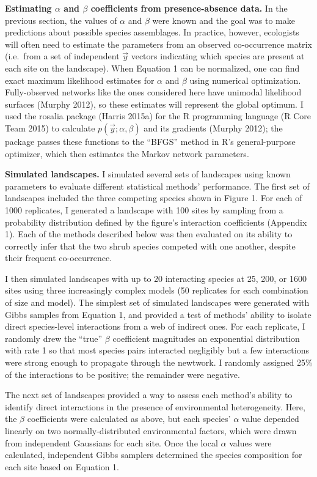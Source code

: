 \documentclass[12pt,]{article}
\begin{document}
\begin{spacing}{1.9}
\begin{flushleft}
\noindent \textbf{Estimating $\alpha$ and $\beta$ coefficients from presence-absence data.}
In the previous section, the values of \(\alpha\) and \(\beta\) were
known and the goal was to make predictions about possible species
assemblages. In practice, however, ecologists will often need to
estimate the parameters from an observed co-occurrence matrix (i.e.~from
a set of independent \(\vec{y}\) vectors indicating which species are
present at each site on the landscape). When Equation 1 can be
normalized, one can find exact maximum likelihood estimates for
\(\alpha\) and \(\beta\) using numerical optimization. Fully-observed
networks like the ones considered here have unimodal likelihood surfaces
(Murphy 2012), so these estimates will represent the global optimum. I
used the rosalia package (Harris 2015a) for the R programming language
(R Core Team 2015) to calculate \(p(\vec{y}; \alpha, \beta)\) and its
gradients (Murphy 2012); the package passes these functions to the
``BFGS'' method in R's general-purpose optimizer, which then estimates
the Markov network parameters.

\noindent \textbf{Simulated landscapes.} I simulated several sets of
landscapes using known parameters to evaluate different statistical
methods' performance. The first set of landscapes included the three
competing species shown in Figure 1. For each of 1000 replicates, I
generated a landscape with 100 sites by sampling from a probability
distribution defined by the figure's interaction coefficients (Appendix
1). Each of the methods described below was then evaluated on its
ability to correctly infer that the two shrub species competed with one
another, despite their frequent co-occurrence.

I then simulated landscapes with up to 20 interacting species at 25,
200, or 1600 sites using three increasingly complex models (50
replicates for each combination of size and model). The simplest set of
simulated landscapes were generated with Gibbs samples from Equation 1,
and provided a test of methods' ability to isolate direct species-level
interactions from a web of indirect ones. For each replicate, I randomly
drew the ``true'' \(\beta\) coefficient magnitudes an exponential
distribution with rate 1 so that most species pairs interacted
negligibly but a few interactions were strong enough to propagate
through the newtwork. I randomly assigned 25\% of the interactions to be
positive; the remainder were negative.

The next set of landscapes provided a way to assess each method's
ability to identify direct interactions in the presence of environmental
heterogeneity. Here, the \(\beta\) coefficients were calculated as
above, but each species' \(\alpha\) value depended linearly on two
normally-distributed environmental factors, which were drawn from
independent Gaussians for each site. Once the local \(\alpha\) values
were calculated, independent Gibbs samplers determined the species
composition for each site based on Equation 1.


\end{flushleft}
\end{spacing}
\end{document}
